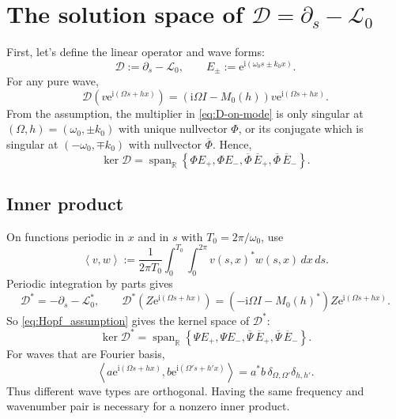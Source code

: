 \documentclass[11pt]{article}
\newcommand{\ii}{\mathrm{i}}
\newcommand{\ee}{\mathrm{e}}
\newcommand{\cL}{\mathcal{L}}
\newcommand{\cD}{\mathcal{D}}
\newcommand{\ip}[2]{\left\langle #1,#2\right\rangle}
\DeclareMathOperator{\spanop}{span}
\begin{document}
\section{The solution space of $\cD=\partial_s-\cL_0$}
First, let's define the linear operator and wave forms:
\begin{equation}
 \cD:=\partial_s-\cL_0,
 \qquad
 E_\pm:=\ee^{\ii(\omega_0s\pm k_0x)}.
 \label{eq:D-and-E}
\end{equation}
For any pure wave,
\begin{equation}
 \cD\left(v\ee^{\ii(\Omega s+hx)}\right)
 =\left(\ii\Omega I-M_0(h)\right)v
 \ee^{\ii(\Omega s+hx)}.
 \label{eq:D-on-mode}
\end{equation}
From the assumption, the multiplier in \eqref{eq:D-on-mode} is only singular at
$(\Omega,h)=(\omega_0,\pm k_0)$ with unique nullvector $\Phi$, or its conjugate which is singular at $(-\omega_0,\mp k_0)$ with nullvector $\overline\Phi$.   Hence,
\begin{equation}
 \ker\cD
 =\spanop_{\mathbb R}\left\{
 \Phi E_+,\Phi E_-,\overline\Phi\,\overline E_+,
 \overline\Phi\,\overline E_-
 \right\}.
 \label{eq:kernel-D}
\end{equation}

\subsection{Inner product}
On functions periodic in $x$ and in $s$ with
$T_0=2\pi/\omega_0$, use
\begin{equation}
 \ip{v}{w}:=\frac{1}{2\pi T_0}
 \int_0^{T_0}\int_0^{2\pi}v(s,x)^*w(s,x)\,dx\,ds.
 \label{eq:inner-product}
\end{equation}
Periodic integration by parts gives
\begin{equation}
 \cD^*=-\partial_s-\cL_0^*, \qquad \cD^*\left(Z\ee^{\ii(\Omega s+hx)}\right)
 =\left(-\ii\Omega I-M_0(h)^*\right)Z
 \ee^{\ii(\Omega s+hx)}.
 \label{eq:D-star}
\end{equation}
So \eqref{eq:Hopf_assumption} gives the kernel space of $\cD^*$:
\begin{equation}
 \ker\cD^*=\spanop_{\mathbb R}\left\{
 \Psi E_+,\Psi E_-,\overline\Psi\,\overline E_+,
 \overline\Psi\,\overline E_-
 \right\}.
 \label{eq:D-adjoint}
\end{equation}
For waves that are Fourier basis,
\begin{equation}
 \ip{a\ee^{\ii(\Omega s+hx)}}
 {b\ee^{\ii(\Omega' s+h'x)}}
 =a^*b\,\delta_{\Omega,\Omega'}\delta_{h,h'}.
 \label{eq:wave-orthogonality}
\end{equation}
Thus different wave types are orthogonal.  Having the same
frequency and wavenumber pair is necessary for a nonzero
inner product.
\end{document}
